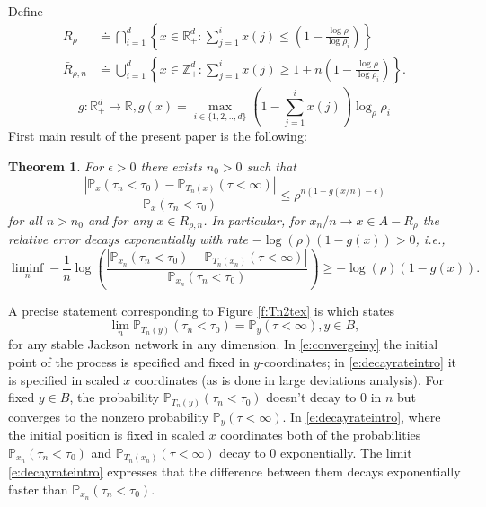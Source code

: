 \documentclass[11pt,a4paper]{article}
\newtheorem{theorem}{Theorem}[section]
\begin{document}
Define
\begin{align*}
R_\rho &\doteq 
\bigcap_{i =1 }^d \left\{x \in {\mathbb R}^d_+: \sum_{j=1}^{i} x(j) \le  \left(1 - \frac{\log \rho}{\log \rho_i}\right) \right\}\\
\bar{R}_{\rho,n} &\doteq 
\bigcup_{i =1}^d \left\{x \in {\mathbb Z}^d_+: \sum_{j=1}^{i} x(j) \ge 1+ n\left(1 - \frac{\log \rho}{\log \rho_i}\right) \right\}.
\end{align*}
\[
g: {\mathbb R}_+^d \mapsto {\mathbb R}, g(x) = \max_{i \in \{1,2,..,d\}}
(1-\sum_{j=1}^i x(j))\log_{\rho}\rho_i
\]
First main result of the present paper is the following:
\begin{theorem}\label{t:main1}
 For  $\epsilon > 0$
there exists $n_0 > 0$ such that
\begin{equation}\label{e:mainrelativeerrorboundintro}
\frac{ |{\mathbb P}_{x}(\tau_n < \tau_0) - {\mathbb P}_{T_n(x)}(\tau < \infty)|}{ {\mathbb P}_{x}(\tau_n < \tau_0)} \le \rho^{n(1 - g(x/n)-\epsilon)}
\end{equation}
for all $n > n_0$ and for any $x \in \bar{R}_{\rho,n}$.
In particular, for $x_n/n \rightarrow x  \in A - R_\rho$ the relative error
decays exponentially with rate $-\log(\rho)(1-g(x))>0$, i.e.,
\begin{equation}\label{e:decayrateintro}
\liminf_n -\frac{1}{n} \log \left(
\frac{ |{\mathbb P}_{x_n}(\tau_n < \tau_0) - {\mathbb P}_{T_n(x_n)}(\tau < \infty)|}{ {\mathbb P}_{x_n}(\tau_n < \tau_0)} \right)
 \ge -\log(\rho)(1-g(x)).
\end{equation}
\end{theorem}


A precise statement corresponding to Figure \ref{f:Tn2tex} is
\cite[Proposition 1]{sezer2018approximation} 
which states
\begin{equation}\label{e:convergeiny}
\lim_n {\mathbb P}_{T_n(y)}(\tau_n < \tau_0) =
{\mathbb P}_y(\tau < \infty), y \in B,
\end{equation} 
for any stable Jackson network
in any dimension. In \eqref{e:convergeiny} the initial point
of the process is specified and fixed in $y$-coordinates;
in \eqref{e:decayrateintro} it is specified in scaled $x$ coordinates
(as is done in large deviations analysis).
For fixed $y \in B$,
the probability ${\mathbb P}_{T_n(y)}(\tau_n < \tau_0)$ doesn't
decay to $0$ in $n$
but converges to the nonzero probability ${\mathbb P}_y(\tau < \infty).$
In \eqref{e:decayrateintro},
where the initial position is fixed in scaled $x$ coordinates both
of the probabilities
${\mathbb P}_{x_n}(\tau_n < \tau_0)$ and
${\mathbb P}_{T_n(x_n)}(\tau < \infty)$ decay to $0$ exponentially.
The limit \eqref{e:decayrateintro} expresses that the difference between
them decays exponentially faster than 
${\mathbb P}_{x_n}(\tau_n < \tau_0)$.
\end{document}
